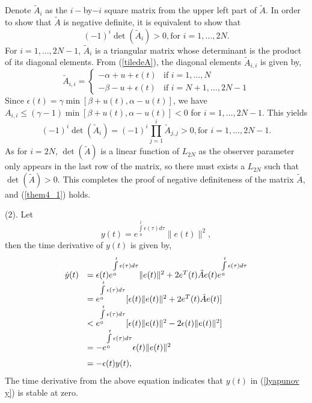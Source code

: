 \documentclass[journal]{IEEEtran}
\begin{document}
Denote $\tilde{A}_{i}$ as the $i-$by$-i$ square matrix from the upper left part of $\tilde{A}$. In order to show that $\tilde{A}$ is negative definite, it is equivalent to show that 
\begin{equation}
(-1)^{i}\det(\tilde{A}_{i}) > 0, \textrm{for $i=1,\ldots, 2N$}.
\end{equation}
For $i=1,\ldots,2N-1$, $\tilde{A}_{i}$ is a triangular matrix whose determinant is the product of its diagonal elements. From (\ref{tiledeA}), the diagonal elements $\tilde{A}_{i,i}$ is given by,
\begin{equation}
\tilde{A}_{i,i}= \left\{
\begin{array}{ll}
-\alpha+u+\epsilon(t) & \textrm{if $i=1,\ldots,N$} \\
-\beta-u+\epsilon(t) & \textrm{if $i=N+1,\ldots,2N-1$}
\end{array}
\right.
\end{equation}
Since $\epsilon(t)=\gamma\min [\beta+u(t),\alpha-u(t)]$, we have $A_{i,i}\leq (\gamma-1)\min [\beta+u(t),\alpha-u(t)] < 0$ for $i=1,\ldots,2N-1$. This yields
\begin{equation}
(-1)^{i}\det(\tilde{A}_{i})=(-1)^{i}\prod\limits_{j=1}^{i}\tilde{A}_{j,j}> 0, \textrm{for $i=1,\ldots,2N-1$}.
\end{equation}
As for $i=2N$, $\det(\tilde{A})$ is a linear function of $L_{2N}$ as the observer parameter only appears in the last row of the matrix, so there must exists a $L_{2N}$ such that $\det(\tilde{A})> 0$. This completes the proof of negative definiteness of the matrix $\tilde{A}$, and (\ref{them4_1}) holds.

(2). Let 
\begin{equation}
\label{lyapunov y}
y(t)=e^{\int\limits_{0}^{t}\epsilon(\tau)d \tau}\|e(t)\|^{2},
\end{equation}
then the time derivative of $y(t)$ is given by,
\begin{equation}
\setlength{\extrarowheight}{7pt}
\label{y upper bound}
\begin{array}{ll}
\dot{y}(t)&=\epsilon(t)e^{\int\limits_{0}^{t}\epsilon(\tau)d \tau}\|e(t)\|^{2}+2e^{T}(t)\tilde{A}e(t)e^{\int\limits_{0}^{t}\epsilon(\tau)d \tau}\\
&=e^{\int\limits_{0}^{t}\epsilon(\tau)d \tau}[\epsilon(t)\|e(t)\|^{2}+2e^{T}(t)\tilde{A}e(t)]\\
&< e^{\int\limits_{0}^{t}\epsilon(\tau)d \tau}[\epsilon(t)\|e(t)\|^{2}-2\epsilon(t)\|e(t)\|^{2}]\\
& = -e^{\int\limits_{0}^{t}\epsilon(\tau)d \tau} \epsilon(t)\|e(t)\|^{2} \\
& =-\epsilon(t)y(t),
\end{array}
\end{equation}
The time derivative from the above equation indicates that $y(t)$ in (\ref{lyapunov y}) is stable at zero. 
\end{document}
